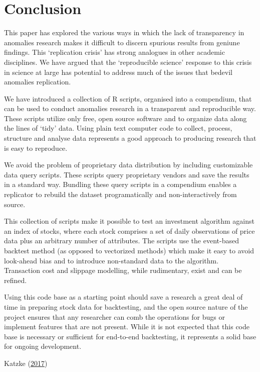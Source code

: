 \documentclass[11pt,preprint, authoryear]{elsarticle}
\numberwithin{equation}{section}
\numberwithin{figure}{section}
\numberwithin{table}{section}
\begin{document}
\section{\texorpdfstring{Conclusion\label{conclusion}}{Conclusion}}\label{conclusion}

This paper has explored the various ways in which the lack of
transparency in anomalies research makes it difficult to discern
spurious results from geniune findings. This `replication crisis' has
strong analogues in other academic disciplines. We have argued that the
`reproducible science' response to this crisis in science at large has
potential to address much of the issues that bedevil anomalies
replication.

We have introduced a collection of R scripts, organised into a
compendium, that can be used to conduct anomalies research in a
transparent and reproducible way. These scripts utilize only free, open
source software and to organize data along the lines of `tidy' data.
Using plain text computer code to collect, process, structure and
analyse data represents a good approach to producing research that is
easy to reproduce.

We avoid the problem of proprietary data distribution by including
customizable data query scripts. These scripts query proprietary vendors
and save the results in a standard way. Bundling these query scripts in
a compendium enables a replicator to rebuild the dataset programatically
and non-interactively from source.

This collection of scripts make it possible to test an investment
algorithm against an index of stocks, where each stock comprises a set
of daily observations of price data plus an arbitrary number of
attributes. The scripts use the event-based backtest method (as opposed
to vectorized methods) which make it easy to avoid look-ahead bias and
to introduce non-standard data to the algorithm. Transaction cost and
slippage modelling, while rudimentary, exist and can be refined.

Using this code base as a starting point should save a research a great
deal of time in preparing stock data for backtesting, and the open
source nature of the project ensures that any researcher can comb the
operations for bugs or implement features that are not present. While it
is not expected that this code base is necessary or sufficient for
end-to-end backtesting, it represents a solid base for ongoing
development.

Katzke (\protect\hyperlink{ref-Katzke2017}{2017})
\end{document}
